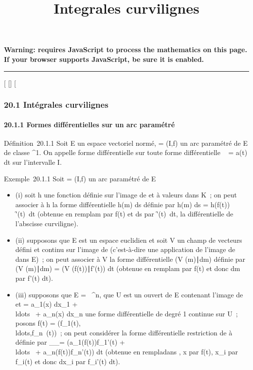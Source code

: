 \documentclass[]{article}
\title{Integrales curvilignes}
\author{}
\date{}
\begin{document}
\maketitle

\textbf{Warning: 
requires JavaScript to process the mathematics on this page.\\ If your
browser supports JavaScript, be sure it is enabled.}

\begin{center}\rule{3in}{0.4pt}\end{center}

[
[]
[

\subsubsection{20.1 Intégrales curvilignes}

\paragraph{20.1.1 Formes différentielles sur un arc paramétré}

Définition~20.1.1 Soit E un espace vectoriel normé, \Gamma = (I,f) un arc
paramétré de E de classe ^1. On appelle forme différentielle
sur \Gamma toute forme différentielle \alpha~ = a(t) dt sur l'intervalle I.

Exemple~20.1.1 Soit \Gamma = (I,f) un arc paramétré de E

\begin{itemize}
\itemsep1pt\parskip0pt
\item
  (i) soit h une fonction définie sur l'image de \Gamma et à valeurs dans K~;
  on peut associer à h la forme différentielle h(m) ds définie par h(m)
  ds = h(f(t)) \f'(t)\
  dt (obtenue en rempla\ccant m par f(t) et ds par
  \f'(t)\ dt, la
  différentielle de l'abscisse curviligne).
\item
  (ii) supposons que E est un espace euclidien et soit V un champ de
  vecteurs défini et continu sur l'image de \Gamma (c'est-à-dire une
  application de l'image de \Gamma dans E)~; on peut associer à V la forme
  différentielle (V (m)∣dm) définie par (V
  (m)∣dm) = \left (V
  (f(t))∣f'(t)\right ) dt
  (obtenue en rempla\ccant m par f(t) et donc dm par
  f'(t) dt).
\item
  (iii) supposons que E = ~^n, que U est un ouvert de E
  contenant l'image de \Gamma et \omega = a_1(x) dx_1 +
  \\ldots~ +
  a_n(x) dx_n une forme différentielle de degré 1
  continue sur U~; posons f(t) =
  (f_1(t),\\ldots,f_n~(t))~;
  on peut considérer la forme différentielle restriction de \omega à \Gamma
  définie par \omega__\Gamma = \left
  (a_1(f(t))f_1'(t) +
  \\ldots~ +
  a_n(f(t))f_n'(t)\right ) dt (obtenue
  en rempla\ccant dans \omega, x par f(t), x_i
  par f_i(t) et donc dx_i par f_i'(t) dt).
\end{itemize}
\end{document}

